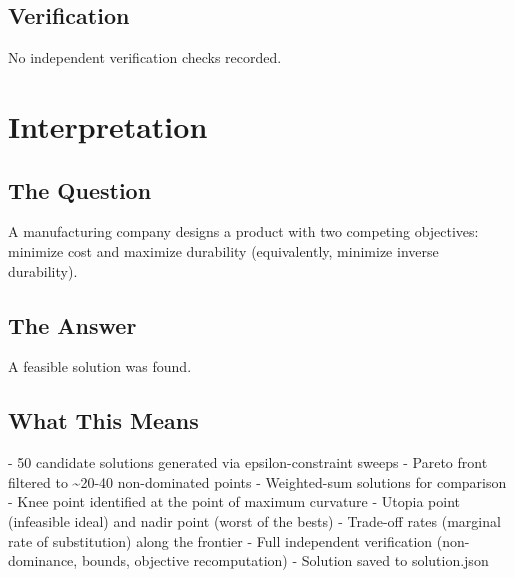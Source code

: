 \documentclass[11pt, a4paper]{article}
\begin{document}
\subsection{Verification}

No independent verification checks recorded.

\section{Interpretation}

\subsection{The Question}
A manufacturing company designs a product with two competing objectives: minimize cost and maximize durability (equivalently, minimize inverse durability).

\subsection{The Answer}

\begin{polyainsight}[title={Bottom Line}]
A feasible solution was found.
\end{polyainsight}

\subsection{What This Means}

- 50 candidate solutions generated via epsilon-constraint sweeps
- Pareto front filtered to \textasciitilde{}20-40 non-dominated points
- Weighted-sum solutions for comparison
- Knee point identified at the point of maximum curvature
- Utopia point (infeasible ideal) and nadir point (worst of the bests)
- Trade-off rates (marginal rate of substitution) along the frontier
- Full independent verification (non-dominance, bounds, objective recomputation)
- Solution saved to solution.json
\end{document}

